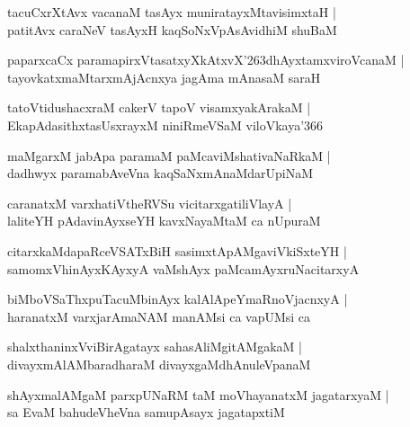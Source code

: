 \documentclass[twoside,12pt,openright]{book}
\def\S{\char'263}
\newcounter{shloka}[chapter]
\begin{document}
\begin{shloka}%
tacuCxrXtAvx vacanaM tasAyx muniratayxMtavisimxtaH |\\
patitAvx caraNeV tasAyxH kaqSoNxVpAsAvidhiM shuBaM 
\end{shloka}

\begin{shloka}%
paparxcaCx paramapirxVtasatxyXkAtxvX\S dhAyxtamxviroVcanaM |\\
tayovkatxmaMtarxmAjAcnxya jagAma mAnasaM saraH 
\end{shloka}

\begin{shloka}%
tatoVtidushacxraM cakerV tapoV visamxyakArakaM |\\
EkapAdasithxtasUsxrayxM niniRmeVSaM viloVkaya\char'366 
\end{shloka}

\begin{shloka}%
maMgarxM jabApa paramaM paMcaviMshativaNaRkaM |\\
dadhwyx paramabAveVna kaqSaNxmAnaMdarUpiNaM 
\end{shloka}

\begin{shloka}%
caranatxM varxhatiVtheRVSu vicitarxgatiliVlayA |\\
laliteYH pAdavinAyxseYH kavxNayaMtaM ca nUpuraM 
\end{shloka}

\begin{shloka}%
citarxkaMdapaRceVSATxBiH sasimxtApAMgaviVkiSxteYH |\\
samomxVhinAyxKAyxyA vaMshAyx paMcamAyxruNacitarxyA 
\end{shloka}

\begin{shloka}%
biMboVSaThxpuTacuMbinAyx kalAlApeYmaRnoVjacnxyA |\\
haranatxM varxjarAmaNAM manAMsi ca vapUMsi ca 
\end{shloka}

\begin{shloka}%
shalxthaninxVviBirAgatayx sahasAliMgitAMgakaM |\\
divayxmAlAMbaradharaM divayxgaMdhAnuleVpanaM
\end{shloka}

\begin{shloka}%
shAyxmalAMgaM parxpUNaRM taM moVhayanatxM jagatarxyaM |\\
sa EvaM bahudeVheVna samupAsayx jagatapxtiM
\end{shloka}
\end{document}
